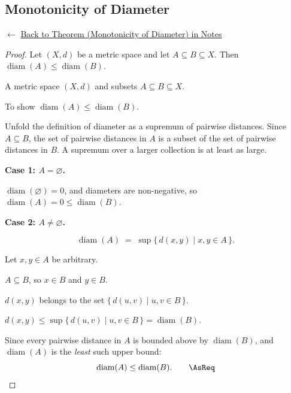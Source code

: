 
\subsection*{Monotonicity of Diameter}
\label{prf:monotonicity-of-diameter}

\begin{remark*}[Return]
$\leftarrow$ \hyperref[thm:monotonicity-of-diameter]{Back to Theorem
(Monotonicity of Diameter) in Notes}
\end{remark*}

\begin{proof}
\Claim Let $(X, d)$ be a metric space and let $A \subseteq B \subseteq X$.
Then $\operatorname{diam}(A) \le \operatorname{diam}(B)$.

\Given A metric space $(X, d)$ and subsets $A \subseteq B \subseteq X$.

\Goal To show $\operatorname{diam}(A) \le \operatorname{diam}(B)$.

\Strategy Unfold the definition of diameter as a supremum of pairwise
distances. Since $A \subseteq B$, the set of pairwise distances in $A$
is a subset of the set of pairwise distances in $B$.
A supremum over a larger collection is at least as large.

\medskip
\noindent\textbf{Case 1: $A = \varnothing$.}

\ByDef $\operatorname{diam}(\varnothing) = 0$, and diameters are non-negative, so
$\operatorname{diam}(A) = 0 \le \operatorname{diam}(B)$.

\medskip
\noindent\textbf{Case 2: $A \neq \varnothing$.}

\ByDef
\[
  \operatorname{diam}(A) \;=\; \sup\bigl\{\, d(x, y) \mid x, y \in A \,\bigr\}.
\]

Let $x, y \in A$ be arbitrary.

\ByAss $A \subseteq B$, so $x \in B$ and $y \in B$.

\Therefore $d(x, y)$ belongs to the set $\{\, d(u, v) \mid u, v \in B \,\}$.

\Hence $d(x, y) \le \sup\{\, d(u, v) \mid u, v \in B \,\} = \operatorname{diam}(B)$.

Since every pairwise distance in $A$ is bounded above by $\operatorname{diam}(B)$,
and $\operatorname{diam}(A)$ is the \emph{least} such upper bound:
\[
  \operatorname{diam}(A) \le \operatorname{diam}(B). \qquad \AsReq
\]
\end{proof}

